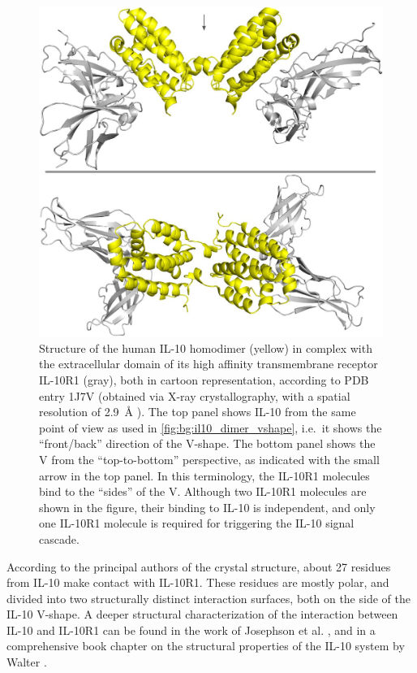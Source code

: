 \begin{figure}
\centering
\includegraphics[width=1.0\textwidth]{gfx/background/il10r1_il10_complex_topside_02.jpg}
\caption[]{
Structure of the human IL-10 homodimer (yellow) in complex with the
extracellular domain of its high affinity transmembrane receptor IL-10R1 (gray),
both in cartoon representation, according to PDB entry 1J7V (obtained via X-ray
crystallography, with a spatial resolution of \SI{2.9}{\angstrom}
\cite{Josephson2001}). The top panel shows IL-10 from the same point of view as
used in \cref{fig:bg:il10_dimer_vshape}, i.e.\ it shows the \enquote{front/back}
direction of the V-shape. The bottom panel shows the V from the
\enquote{top-to-bottom} perspective, as indicated with the small arrow in the
top panel. In this terminology, the IL-10R1 molecules bind to the
\enquote{sides} of the V. Although two IL-10R1 molecules are shown in the
figure, their binding to IL-10 is independent, and only one IL-10R1 molecule is
required for triggering the IL-10 signal cascade.}
\label{fig:bg:il10_il10r1_complex}
\end{figure}

According to the principal authors of the crystal structure, about 27 residues
from IL-10 make contact with IL-10R1. These residues are mostly polar, and
divided into two structurally distinct interaction surfaces, both on the side of
the IL-10 V-shape. A deeper structural characterization of the interaction
between IL-10 and IL-10R1 can be found in the work of Josephson et al.
\cite{Josephson2001}, and in a comprehensive book chapter on the structural
properties of the IL-10 system by Walter \cite{bookchapter_walter_il10_2004}.



